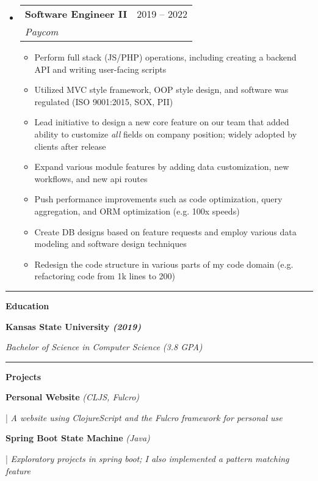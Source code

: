 \documentclass[letterpaper,11pt]{article}
\makeatletter
\newcommand{\resumeItem}[1]{
  \item\small{
    {#1 \vspace{-2pt}}
  }
}
\newcommand{\resumeSubheading}[4]{
  \vspace{-2pt}\item
    \begin{tabular*}{0.97\textwidth}[t]{l@{\extracolsep{\fill}}r}
      \textbf{#1} & #2 \\
      \textit{\small#3} & \textit{\small #4} \\
    \end{tabular*}\vspace{0pt}
}
\newcommand{\resumeSubHeadingListStart}{\begin{itemize}[leftmargin=0.15cm, label={}]}
\newcommand{\resumeSubHeadingListEnd}{\end{itemize}}
\newcommand{\resumeItemListStart}{\begin{itemize}}
\newcommand{\resumeItemListEnd}{\end{itemize}\vspace{-5pt}}
\makeatother
\begin{document}
\resumeSubHeadingListStart
\resumeSubheading
{Software Engineer II}{2019 – 2022}
{Paycom}{}
\resumeItemListStart
\resumeItem{Perform full stack (JS/PHP) operations, including creating a backend API and writing user-facing scripts}
\resumeItem{Utilized MVC style framework, OOP style design, and software was regulated (ISO 9001:2015, SOX, PII)}
\resumeItem{Lead initiative to design a new core feature on our team that added ability to customize \textit{all} fields on company position; widely adopted by clients after release }
\resumeItem{Expand various module features by adding data customization, new workflows, and new api routes}
\resumeItem{Push performance improvements such as code optimization, query aggregation, and ORM optimization (e.g. 100x speeds)}
\resumeItem{Create DB designs based on feature requests and employ various data modeling and software design techniques}
\resumeItem{Redesign the code structure in various parts of my code domain (e.g. refactoring code from 1k lines to 200)}
\resumeItemListEnd
\resumeSubHeadingListEnd
\noindent\rule{19.5cm}{0.4pt}

\textbf{\large \textcolor{magic_blue}{Education}}

\begin{minipage}[t]{0.45\textwidth}
    \raggedright
    \textbf{ Kansas State University \textit{(2019)}} \\
\end{minipage}
\hfill
\begin{minipage}[t]{0.45\textwidth}
    \raggedleft
    \textit{Bachelor of Science in Computer Science (3.8 GPA)} \\
\end{minipage}
\noindent\rule{19.5cm}{0.4pt}

\textbf{\large \textcolor{magic_blue}{Projects}}

\begin{minipage}[t]{0.28\textwidth}
	\raggedright
	\textbf{ Personal Website }\textit{(CLJS, Fulcro)} \\
\end{minipage}
\hfill
\begin{minipage}[t]{0.70\textwidth}
	\raggedright
	|\textit{ A website using ClojureScript and the Fulcro framework for personal use} \\
\end{minipage}

\begin{minipage}[t]{0.28\textwidth}
	\raggedright
	\textbf{ Spring Boot State Machine }\textit{(Java)} \\
\end{minipage}
\hfill
\begin{minipage}[t]{0.70\textwidth}
	\raggedright
	|\textit{ Exploratory projects in spring boot; I also implemented a pattern matching feature } \\
\end{minipage}
\end{document}
